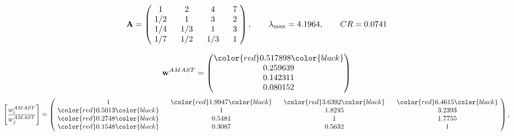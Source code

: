 \begin{example}
\begin{equation*}
\mathbf{A} =
\begin{pmatrix}
$\,\,$ 1 $\,\,$ & $\,\,$2$\,\,$ & $\,\,$4$\,\,$ & $\,\,$7 $\,\,$ \\
$\,\,$ 1/2$\,\,$ & $\,\,$ 1 $\,\,$ & $\,\,$3$\,\,$ & $\,\,$2 $\,\,$ \\
$\,\,$ 1/4$\,\,$ & $\,\,$ 1/3$\,\,$ & $\,\,$ 1 $\,\,$ & $\,\,$3 $\,\,$ \\
$\,\,$ 1/7$\,\,$ & $\,\,$ 1/2$\,\,$ & $\,\,$ 1/3$\,\,$ & $\,\,$ 1  $\,\,$ \\
\end{pmatrix},
\qquad
\lambda_{\max} =
4.1964,
\qquad
CR = 0.0741
\end{equation*}

\begin{equation*}
\mathbf{w}^{AMAST} =
\begin{pmatrix}
\color{red} 0.517898\color{black} \\
0.259639\\
0.142311\\
0.080152
\end{pmatrix}\end{equation*}
\begin{equation*}
\left[ \frac{{w}^{AMAST}_i}{{w}^{AMAST}_j} \right] =
\begin{pmatrix}
$\,\,$ 1 $\,\,$ & $\,\,$\color{red} 1.9947\color{black} $\,\,$ & $\,\,$\color{red} 3.6392\color{black} $\,\,$ & $\,\,$\color{red} 6.4615\color{black} $\,\,$ \\
$\,\,$\color{red} 0.5013\color{black} $\,\,$ & $\,\,$ 1 $\,\,$ & $\,\,$1.8245$\,\,$ & $\,\,$3.2393  $\,\,$ \\
$\,\,$\color{red} 0.2748\color{black} $\,\,$ & $\,\,$0.5481$\,\,$ & $\,\,$ 1 $\,\,$ & $\,\,$1.7755 $\,\,$ \\
$\,\,$\color{red} 0.1548\color{black} $\,\,$ & $\,\,$0.3087$\,\,$ & $\,\,$0.5632$\,\,$ & $\,\,$ 1  $\,\,$ \\
\end{pmatrix},
\end{equation*}


\end{example}
